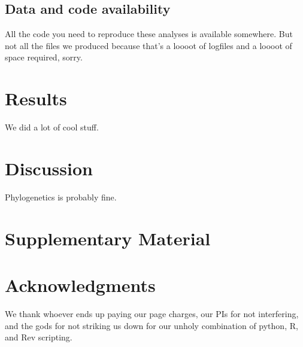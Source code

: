 \documentclass[11pt]{article}
\begin{document}
\subsection*{Data and code availability\label{sec:itsongithub}}
All the code you need to reproduce these analyses is available somewhere.
But not all the files we produced because that's a loooot of logfiles and a loooot of space required, sorry.

\section*{Results\label{sec:results}}

We did a lot of cool stuff.

\section*{Discussion\label{sec:discussion}}

Phylogenetics is probably fine.

\section*{Supplementary Material}


\section*{Acknowledgments}
We thank whoever ends up paying our page charges, our PIs for not interfering, and the gods for not striking us down for our unholy combination of python, R, and Rev scripting.



\end{document}
